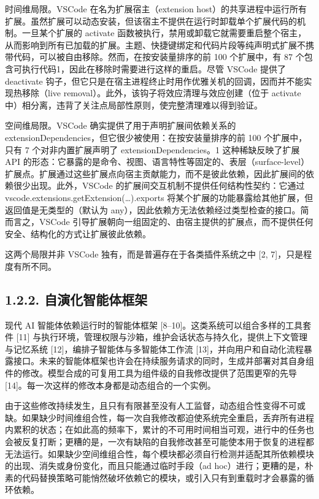 时间维局限。VSCode 在名为扩展宿主（extension host）的共享进程中运行所有扩展。虽然扩展可以动态安装，但该宿主不提供在运行时卸载单个扩展代码的机制。一旦某个扩展的 activate 函数被执行，禁用或卸载它就需要重启整个宿主，从而影响到所有已加载的扩展。主题、快捷键绑定和代码片段等纯声明式扩展不携带代码，可以被自由移除。然而，在按安装量排序的前 100 个扩展中，有 87 个包含可执行代码1，因此在移除时需要进行这样的重启。尽管 VSCode 提供了 deactivate 钩子，但它只是在宿主进程终止时用作优雅关机的回调，因而并不能实现热移除（live removal）。此外，该钩子将效应清理与效应创建（位于 activate 中）相分离，违背了关注点局部性原则，使完整清理难以得到验证。

空间维局限。VSCode 确实提供了用于声明扩展间依赖关系的 extensionDependencies，但它很少被使用：在按安装量排序的前 100 个扩展中，只有 7 个对非内置扩展声明了 extensionDependencies。1 这种稀缺反映了扩展 API 的形态：它暴露的是命令、视图、语言特性等固定的、表层（surface-level）扩展点。扩展通过这些扩展点向宿主贡献能力，而不是彼此依赖，因此扩展间的依赖很少出现。此外，VSCode 的扩展间交互机制不提供任何结构性契约：它通过 vscode.extensions.getExtension(\ldots).exports 将某个扩展的功能暴露给其他扩展，但返回值是无类型的（默认为 any），因此依赖方无法依赖经过类型检查的接口。简而言之，VSCode 引导扩展朝向一组固定的、由宿主提供的扩展点，而不提供任何安全、结构化的方式让扩展彼此依赖。

这两个局限并非 VSCode 独有，而是普遍存在于各类插件系统之中 {[}2, 7{]}，只是程度有所不同。

\subsection{1.2.2. 自演化智能体框架}\label{self-evolving-agent-harnesses}

现代 AI 智能体依赖运行时的智能体框架 {[}8--10{]}。这类系统可以组合多样的工具套件 {[}11{]} 与执行环境，管理权限与沙箱，维护会话状态与持久化，提供上下文管理与记忆系统 {[}12{]}，编排子智能体与多智能体工作流 {[}13{]}，并向用户和自动化流程暴露接口。未来的智能体框架也许会在持续服务请求的同时，生成并部署对其自身组件的修改。模型合成的可复用工具为组件级的自我修改提供了范围更窄的先导 {[}14{]}。每一次这样的修改本身都是动态组合的一个实例。

由于这些修改持续发生，且只有有限甚至没有人工监督，动态组合性变得不可或缺。如果缺少时间维组合性，每一次自我修改都迫使系统完全重启，丢弃所有进程内累积的状态；在如此高的频率下，累计的不可用时间相当可观，进行中的任务也会被反复打断；更糟的是，一次有缺陷的自我修改甚至可能使本用于恢复的进程都无法运行。如果缺少空间维组合性，每个模块都必须自行检测并适配其所依赖模块的出现、消失或身份变化，而且只能通过临时手段（ad hoc）进行；更糟的是，朴素的代码替换策略可能悄然破坏依赖它的模块，或引入只有到重载时才会暴露的循环依赖。

